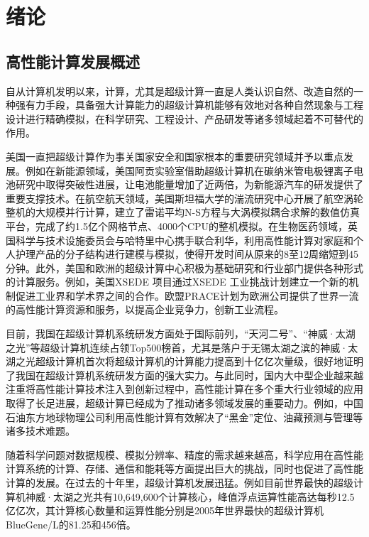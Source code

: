 \chapter{绪论}

\section{高性能计算发展概述}

自从计算机发明以来，计算，尤其是超级计算一直是人类认识自然、改造自然的一种强有力手段，具备强大计算能力的超级计算机能够有效地对各种自然现象与工程设计进行精确模拟，在科学研究、工程设计、产品研发等诸多领域起着不可替代的作用。

美国一直把超级计算作为事关国家安全和国家根本的重要研究领域并予以重点发展。例如在新能源领域，美国阿贡实验室借助超级计算机在碳纳米管电极锂离子电池研究中取得突破性进展，让电池能量增加了近两倍，为新能源汽车的研发提供了重要支撑技术\cite{xiong2012self}。在航空航天领域，美国斯坦福大学的湍流研究中心开展了航空涡轮整机的大规模并行计算，建立了雷诺平均N-S方程与大涡模拟耦合求解的数值仿真平台，完成了约1.5亿个网格节点、4000个CPU的整机模拟\cite{reynolds2003aircraft}。在生物医药领域，英国科学与技术设施委员会与哈特里中心携手联合利华，利用高性能计算对家庭和个人护理产品的分子结构进行建模与模拟，使得开发时间从原来的8至12周缩短到45分钟\cite{Unilever}。此外，美国和欧洲的超级计算中心积极为基础研究和行业部门提供各种形式的计算服务。例如，美国XSEDE 项目通过XSEDE 工业挑战计划建立一个新的机制促进工业界和学术界之间的合作\cite{Unilever}。欧盟PRACE计划为欧洲公司提供了世界一流的高性能计算资源和服务\cite{PRACE}，以提高企业竞争力，创新工业流程。

目前，我国在超级计算机系统研发方面处于国际前列，“天河二号”\cite{tianhe-2}、“神威·太湖之光”\cite{fu2016sunway}等超级计算机连续占领Top500榜首，尤其是落户于无锡太湖之滨的神威·太湖之光超级计算机首次将超级计算机的计算能力提高到十亿亿次量级\cite{fu2016sunway}，很好地证明了我国在超级计算机系统研发方面的强大实力。与此同时，国内大中型企业越来越注重将高性能计算技术注入到创新过程中，高性能计算在多个重大行业领域的应用取得了长足进展，超级计算已经成为了推动诸多领域发展的重要动力。例如，中国石油东方地球物理公司利用高性能计算有效解决了“黑金”定位、油藏预测与管理等诸多技术难题\cite{luo2007hpc}。

随着科学问题对数据规模、模拟分辨率、精度的需求越来越高，科学应用在高性能计算系统的计算、存储、通信和能耗等方面提出巨大的挑战，同时也促进了高性能计算的发展。在过去的十年里，超级计算机发展迅猛。例如目前世界最快的超级计算机神威·太湖之光共有10,649,600个计算核心，峰值浮点运算性能高达每秒12.5 亿亿次，其计算核心数量和运算性能分别是2005年世界最快的超级计算机BlueGene/L的81.25和456倍\cite{top5002015}。

